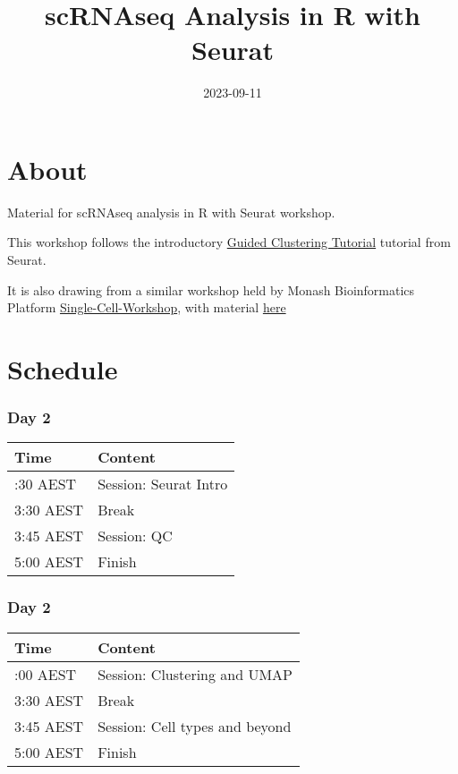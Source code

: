 \documentclass[
]{book}
\title{scRNAseq Analysis in R with Seurat}
\author{}
\date{\vspace{-2.5em}2023-09-11}
\begin{document}
\maketitle

{
\setcounter{tocdepth}{1}
\tableofcontents
}
\hypertarget{about}{%
\chapter{About}\label{about}}

Material for scRNAseq analysis in R with Seurat workshop.

This workshop follows the introductory \href{https://satijalab.org/seurat/articles/pbmc3k_tutorial.html}{Guided Clustering Tutorial} tutorial from Seurat.

It is also drawing from a similar workshop held by Monash Bioinformatics Platform \href{https://monashbioinformaticsplatform.github.io/Single-Cell-Workshop/}{Single-Cell-Workshop}, with material \href{https://monashbioinformaticsplatform.github.io/Single-Cell-Workshop/pbmc3k_tutorial.html}{here}

\hypertarget{schedule}{%
\chapter{Schedule}\label{schedule}}

\hypertarget{day-2}{%
\subsection*{Day 2}\label{day-2}}

\begin{longtable}[]{@{}ll@{}}
\toprule\noalign{}
Time & Content \\
\midrule\noalign{}
\endhead
\bottomrule\noalign{}
\endlastfoot
2:30 AEST & Session: Seurat Intro \\
3:30 AEST & Break \\
3:45 AEST & Session: QC \\
5:00 AEST & Finish \\
\end{longtable}

\hypertarget{day-2-1}{%
\subsection*{Day 2}\label{day-2-1}}

\begin{longtable}[]{@{}ll@{}}
\toprule\noalign{}
Time & Content \\
\midrule\noalign{}
\endhead
\bottomrule\noalign{}
\endlastfoot
2:00 AEST & Session: Clustering and UMAP \\
3:30 AEST & Break \\
3:45 AEST & Session: Cell types and beyond \\
5:00 AEST & Finish \\
\end{longtable}
\end{document}
